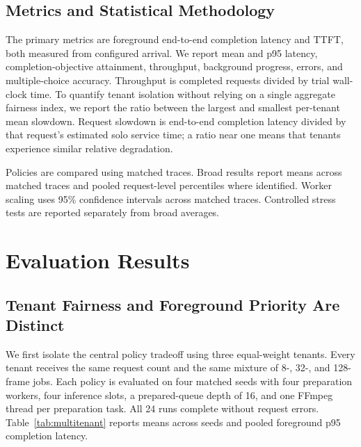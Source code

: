 \documentclass[sigconf,review,anonymous]{acmart}
\begin{document}
\subsection{Metrics and Statistical Methodology}

The primary metrics are foreground end-to-end completion latency and TTFT,
both measured from configured arrival. We report mean and p95 latency,
completion-objective attainment, throughput, background progress, errors, and
multiple-choice accuracy. Throughput is completed requests divided by trial
wall-clock time. To quantify tenant isolation without relying on a single
aggregate fairness index, we report the ratio between the largest and smallest
per-tenant mean slowdown. Request slowdown is end-to-end completion latency
divided by that request's estimated solo service time; a ratio near one means
that tenants experience similar relative degradation.

Policies are compared using matched traces. Broad results report means across
matched traces and pooled request-level percentiles where identified. Worker
scaling uses 95\% confidence intervals across matched traces. Controlled
stress tests are reported separately from broad averages.

\section{Evaluation Results}
\label{sec:results}

\subsection{Tenant Fairness and Foreground Priority Are Distinct}

We first isolate the central policy tradeoff using three equal-weight tenants.
Every tenant receives the same request count and the same mixture of 8-, 32-,
and 128-frame jobs. Each policy is evaluated on four matched seeds with four
preparation workers, four inference slots, a prepared-queue depth of 16, and
one FFmpeg thread per preparation task. All 24 runs complete without request
errors. Table~\ref{tab:multitenant} reports means across seeds and pooled
foreground p95 completion latency.
\end{document}
